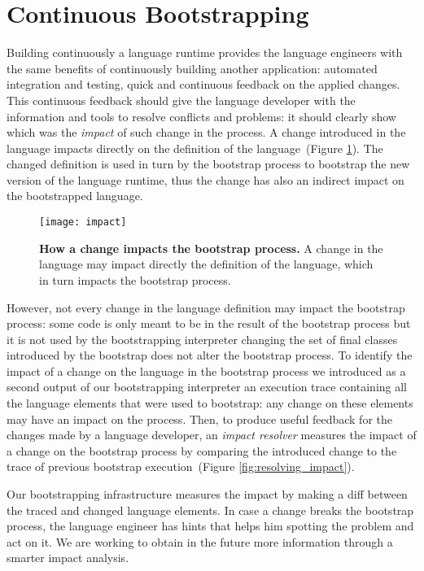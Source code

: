 \section{Continuous Bootstrapping}\label{sec:continuous_bootstrapping}

Building continuously a language runtime provides the language engineers with the same benefits of continuously building another application: automated integration and testing, quick and continuous feedback on the applied changes. This continuous feedback should give the language developer with the information and tools to resolve conflicts and problems: it should clearly show which was the \emph{impact} of such change in the process. A change introduced in the language impacts directly on the definition of the language~(Figure \ref{fig:impact}). The changed definition is used in turn by the bootstrap process to bootstrap the new version of the language runtime, thus the change has also an indirect impact on the bootstrapped language. 

\begin{figure}[ht]
\center
\texttt{[image: impact]}
\caption{\textbf{How a change impacts the bootstrap process.} A change in the language may impact directly the definition of the language, which in turn impacts the bootstrap process.\label{fig:impact}}
\end{figure}

However, not every change in the language definition may impact the bootstrap process: some code is only meant to be in the result of the bootstrap process but it is not used by the bootstrapping interpreter \eg changing the set of final classes introduced by the bootstrap does not alter the bootstrap process. To identify the impact of a change on the language in the bootstrap process we introduced as a second output of our bootstrapping interpreter an execution trace containing all the language elements that were used to bootstrap: any change on these elements may have an impact on the process. Then, to produce useful feedback for the changes made by a language developer, an \emph{impact resolver} measures the impact of a change on the bootstrap process by comparing the introduced change to the trace of previous bootstrap execution~(Figure \ref{fig:resolving_impact}).

Our bootstrapping infrastructure measures the impact by making a diff between the traced and changed language elements. In case a change breaks the bootstrap process, the language engineer has hints that helps him spotting the problem and act on it. We are working to obtain in the future more information through a smarter impact analysis.

